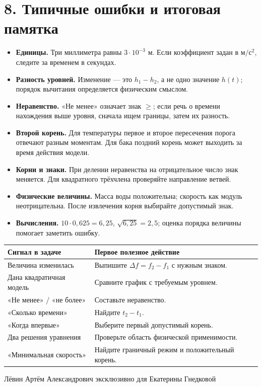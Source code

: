 \documentclass[a4paper,12pt]{article}
\newcommand{\sectionline}{\par\vspace{-1mm}{\color{accent}\hrule height .45pt}\vspace{4mm}}
\newcommand{\sect}[2]{\section*{\textcolor{darkaccent}{#1. #2}}\sectionline}
\begin{document}
\sect{8}{Типичные ошибки и итоговая памятка}
\begin{itemize}
\item \textbf{Единицы.} Три миллиметра равны $3\cdot10^{-3}$ м. Если коэффициент задан в $\text{м}/\text{с}^2$, следите за временем в секундах.
\item \textbf{Разность уровней.} Изменение --- это $h_1-h_2$, а не одно значение $h(t)$; порядок вычитания определяется физическим смыслом.
\item \textbf{Неравенство.} «Не менее» означает знак $\ge$; если речь о времени нахождения выше уровня, сначала ищем границы, затем их разность.
\item \textbf{Второй корень.} Для температуры первое и второе пересечения порога отвечают разным моментам. Для бака поздний корень может выходить за время действия модели.
\item \textbf{Корни и знаки.} При делении неравенства на отрицательное число знак меняется. Для квадратного трёхчлена проверяйте направление ветвей.
\item \textbf{Физические величины.} Масса воды положительна; скорость как модуль неотрицательна. После извлечения корня выбирайте допустимый знак.
\item \textbf{Вычисления.} $10\cdot0{,}625=6{,}25$, $\sqrt{6{,}25}=2{,}5$; оценка порядка величины помогает заметить ошибку.
\end{itemize}

\vspace{4mm}
\begin{tabularx}{\linewidth}{@{}p{.37\linewidth}X@{}}
\toprule
\textcolor{darkaccent}{Сигнал в задаче} & \textcolor{darkaccent}{Первое полезное действие}\\
\midrule
Величина изменилась & Выпишите $\Delta f=f_2-f_1$ с нужным знаком.\\
Дана квадратичная модель & Сравните график с требуемым уровнем.\\
«Не менее» / «не более» & Составьте неравенство.\\
«Сколько времени» & Найдите $t_2-t_1$.\\
«Когда впервые» & Выберите первый допустимый корень.\\
Два решения уравнения & Проверьте область физической применимости.\\
«Минимальная скорость» & Найдите граничный режим и положительный корень.\\
\bottomrule
\end{tabularx}
\vfill
\begin{center}
\small\textcolor{mute}{Лёвин Артём Александрович эксклюзивно для Екатерины Гнедковой}
\end{center}
\end{document}
